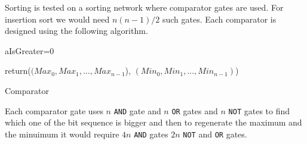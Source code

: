 \documentclass{acm_proc_article-sp}
\begin{document}
Sorting is tested on a sorting network where comparator gates are used. For insertion sort we would need $n(n-1)/2$ such gates. Each comparator is designed using the following algorithm. 

\linesnumbered
\begin{algorithm}[H]
 \SetVline
 aIsGreater=$0$\;



return($(Max_0,Max_1,\ldots, Max_{n-1}$), $(Min_0,Min_1,\ldots, Min_{n-1})$)
 \caption{Comparator\label{Code:algo}}
\end{algorithm}

Each comparator gate uses $n$ \texttt{AND} gate and $n$ \texttt{OR} gates and $n$ \texttt{NOT} gates to find which one of the bit sequence is bigger and then to regenerate the maximum and the minuimum it would require $4n$ \texttt{AND} gates $2n$ \texttt{NOT} and \texttt{OR} gates.  
\end{document}
